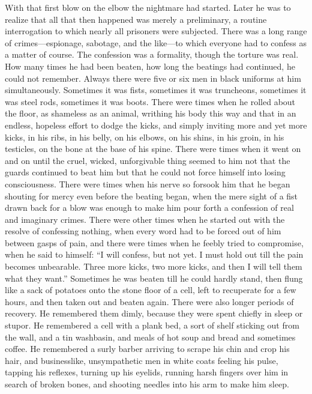 \begin{paracol}{2}
With that first blow on the elbow the nightmare had started. Later he
was to realize that all that then happened was merely a preliminary, a
routine interrogation to which nearly all prisoners were subjected.
There was a long range of crimes---espionage, sabotage, and the
like---to which everyone had to confess as a matter of course. The
confession was a formality, though the torture was real. How many times
he had been beaten, how long the beatings had continued, he could not
remember. Always there were five or six men in black uniforms at him
simultaneously. Sometimes it was fists, sometimes it was truncheons,
sometimes it was steel rods, sometimes it was boots. There were times
when he rolled about the floor, as shameless as an animal, writhing his
body this way and that in an endless, hopeless effort to dodge the
kicks, and simply inviting more and yet more kicks, in his ribs, in his
belly, on his elbows, on his shins, in his groin, in his testicles, on
the bone at the base of his spine. There were times when it went on and
on until the cruel, wicked, unforgivable thing seemed to him not that
the guards continued to beat him but that he could not force himself
into losing consciousness. There were times when his nerve so forsook
him that he began shouting for mercy even before the beating began, when
the mere sight of a fist drawn back for a blow was enough to make him
pour forth a confession of real and imaginary crimes. There were other
times when he started out with the resolve of confessing nothing, when
every word had to be forced out of him between gasps of pain, and there
were times when he feebly tried to compromise, when he said to himself:
``I will confess, but not yet. I must hold out till the pain becomes
unbearable. Three more kicks, two more kicks, and then I will tell them
what they want.'' Sometimes he was beaten till he could hardly stand,
then flung like a sack of potatoes onto the stone floor of a cell, left
to recuperate for a few hours, and then taken out and beaten again.
There were also longer periods of recovery. He remembered them dimly,
because they were spent chiefly in sleep or stupor. He remembered a cell
with a plank bed, a sort of shelf sticking out from the wall, and a tin
washbasin, and meals of hot soup and bread and sometimes coffee. He
remembered a surly barber arriving to scrape his chin and crop his hair,
and businesslike, unsympathetic men in white coats feeling his pulse,
tapping his reflexes, turning up his eyelids, running harsh fingers over
him in search of broken bones, and shooting needles into his arm to make
him sleep.


\end{paracol}
